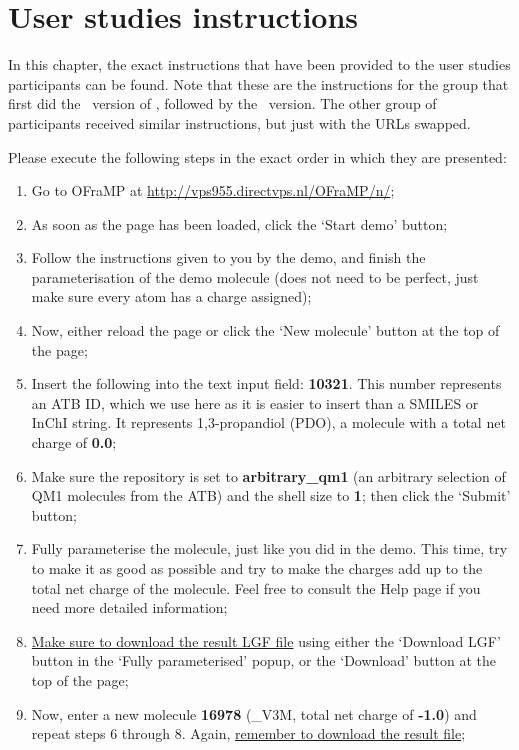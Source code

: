 \chapter{User studies instructions}

In this chapter, the exact instructions that have been provided to the user studies participants can be found. Note that these are the instructions for the group that first did the \IDa\ version of \oframp, followed by the \IDb\ version. The other group of participants received similar instructions, but just with the URLs swapped.

Please execute the following steps in the exact order in which they are presented:
\begin{enumerate}
\item Go to OFraMP at \url{http://vps955.directvps.nl/OFraMP/n/};
\item As soon as the page has been loaded, click the `Start demo' button;
\item Follow the instructions given to you by the demo, and finish the parameterisation of the demo molecule (does not need to be perfect, just make sure every atom has a charge assigned);
\item Now, either reload the page or click the `New molecule' button at the top of the page;
\item Insert the following into the text input field: \textbf{10321}. This number represents an ATB ID, which we use here as it is easier to insert than a SMILES or InChI string. It represents 1,3-propandiol (PDO), a molecule with a total net charge of \textbf{0.0};
\item Make sure the repository is set to \textbf{arbitrary\_qm1} (an arbitrary selection of QM1 molecules from the ATB) and the shell size to \textbf{1}; then click the `Submit' button;
\item Fully parameterise the molecule, just like you did in the demo. This time, try to make it as good as possible and try to make the charges add up to the total net charge of the molecule. Feel free to consult the Help page if you need more detailed information;
\item \underline{Make sure to download the result LGF file} using either the `Download LGF' button in the `Fully parameterised' popup, or the `Download' button at the top of the page;
\item Now, enter a new molecule \textbf{16978} (\_V3M, total net charge of \textbf{-1.0}) and repeat steps 6 through 8. Again, \underline{remember to download the result file};

\end{enumerate}

